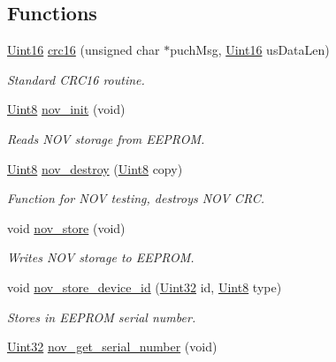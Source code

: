 \subsection*{Functions}
\begin{DoxyCompactItemize}
\item 
\hyperlink{a00072_a59a9f6be4562c327cbfb4f7e8e18f08b}{Uint16} \hyperlink{a00060_a6553827687db2137ee550ad6e1d2f316}{crc16} (unsigned char $\ast$puch\+Msg, \hyperlink{a00072_a59a9f6be4562c327cbfb4f7e8e18f08b}{Uint16} us\+Data\+Len)
\begin{DoxyCompactList}\small\item\em Standard C\+R\+C16 routine. \end{DoxyCompactList}\item 
\hyperlink{a00072_af84840501dec18061d18a68c162a8fa2}{Uint8} \hyperlink{a00060_a8ad2f815848f1668763c01ff9d45a01b}{nov\+\_\+init} (void)
\begin{DoxyCompactList}\small\item\em Reads N\+O\+V storage from E\+E\+P\+R\+O\+M. \end{DoxyCompactList}\item 
\hyperlink{a00072_af84840501dec18061d18a68c162a8fa2}{Uint8} \hyperlink{a00060_aeb181884e4c104cd984afdd6eb2a2782}{nov\+\_\+destroy} (\hyperlink{a00072_af84840501dec18061d18a68c162a8fa2}{Uint8} copy)
\begin{DoxyCompactList}\small\item\em Function for N\+O\+V testing, destroys N\+O\+V C\+R\+C. \end{DoxyCompactList}\item 
void \hyperlink{a00060_a90aef186f45a15d94bf0247122194991}{nov\+\_\+store} (void)
\begin{DoxyCompactList}\small\item\em Writes N\+O\+V storage to E\+E\+P\+R\+O\+M. \end{DoxyCompactList}\item 
void \hyperlink{a00060_a9aa94b184db1bd55b6a4a61a34c14c8d}{nov\+\_\+store\+\_\+device\+\_\+id} (\hyperlink{a00072_aba99025e657f892beb7ff31cecf64653}{Uint32} id, \hyperlink{a00072_af84840501dec18061d18a68c162a8fa2}{Uint8} type)
\begin{DoxyCompactList}\small\item\em Stores in E\+E\+P\+R\+O\+M serial number. \end{DoxyCompactList}\item 
\hyperlink{a00072_aba99025e657f892beb7ff31cecf64653}{Uint32} \hyperlink{a00060_a86b863ea185628aff5a00b4defbbb6e1}{nov\+\_\+get\+\_\+serial\+\_\+number} (void)

\end{DoxyCompactItemize}
